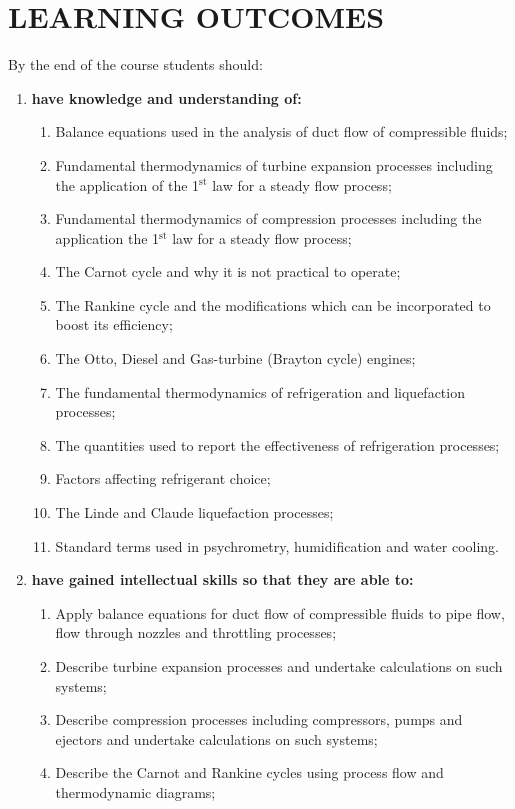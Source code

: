 \documentclass[12pts,a4paper,amsmath,amssymb,floatfix]{article}%
\begin{document}
\section{LEARNING OUTCOMES}
By the end of the course students should:
\begin{enumerate}[{\bf A.}]
\item {\bf have knowledge and understanding of:}
  \begin{enumerate}
    \item Balance equations used in the analysis of duct flow of compressible fluids;
    \item Fundamental thermodynamics of turbine expansion processes including the application of the 1$^{\text{st}}$ law for a steady flow process;
    \item Fundamental thermodynamics of compression processes including the application the 1$^{\text{st}}$ law for a steady flow process;
    \item The Carnot cycle and why it is not practical to operate;
    \item The Rankine cycle and the modifications which can be incorporated to boost its efficiency;
    \item The Otto, Diesel and Gas-turbine (Brayton cycle) engines;
    \item The fundamental thermodynamics of refrigeration and liquefaction processes;
    \item The quantities used to report the effectiveness of refrigeration processes;
    \item Factors affecting refrigerant choice;
    \item The Linde and Claude liquefaction processes;
    \item Standard terms used in psychrometry, humidification and water cooling.
  \end{enumerate}
\item {\bf have gained intellectual skills so that they are able to:}
  \begin{enumerate}
    \item Apply balance equations for duct flow of compressible fluids to pipe flow, flow through nozzles and throttling processes;
    \item Describe turbine expansion processes and undertake calculations on such systems;
    \item Describe compression processes including compressors, pumps and ejectors and undertake calculations on such systems;
    \item Describe the Carnot and Rankine cycles using process flow and thermodynamic diagrams;

\end{enumerate}
\end{enumerate}
\end{document}
